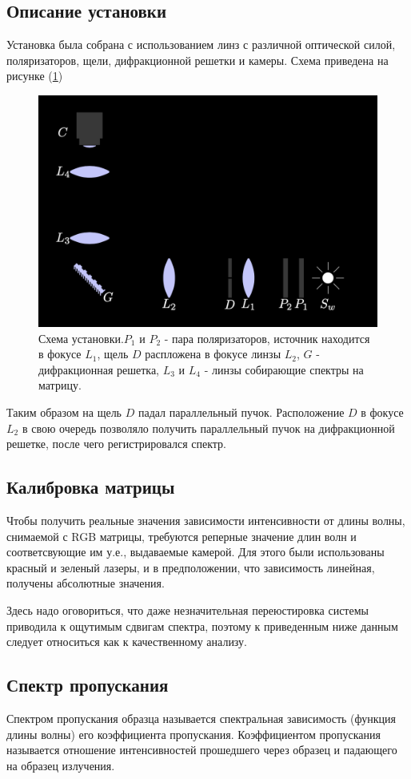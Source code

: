 \documentclass[a4paper, 12pt]{article}
\begin{document}
\subsection{Описание установки}

Установка была собрана с использованием линз с различной оптической силой, поляризаторов, щели, дифракционной решетки и камеры. Схема приведена на рисунке (\ref{fig:scheme})

\begin{figure}[H]
	\centering
	\includegraphics[width=0.7\linewidth]{Scheme.png}
	\caption{Схема установки.$P_1$ и $P_2$ - пара поляризаторов, источник находится в фокусе $L_1$, щель $D$ распложена в фокусе линзы $L_2$, $G$ - дифракционная решетка, $L_3$ и $L_4$ - линзы собирающие спектры на матрицу.}
	\label{fig:scheme}
\end{figure}

Таким образом на щель $D$ падал параллельный пучок. Расположение $D$ в фокусе $L_2$ в свою очередь позволяло получить параллельный пучок на дифракционной решетке, после чего регистрировался спектр.

\subsection{Калибровка матрицы}

Чтобы получить реальные значения зависимости интенсивности от длины волны, снимаемой с RGB матрицы, требуются реперные значение длин волн и соответсвующие им у.е., выдаваемые камерой. Для этого были использованы красный и зеленый лазеры, и в предположении, что зависимость линейная, получены абсолютные значения.

Здесь надо оговориться, что даже незначительная переюстировка системы приводила к ощутимым сдвигам спектра, поэтому к приведенным ниже данным следует относиться как к качественному анализу.


\subsection{Спектр пропускания}
Спектром пропускания образца называется спектральная зависимость (функция длины волны) его коэффициента пропускания. Коэффициентом пропускания называется отношение интенсивностей прошедшего через образец и падающего на образец излучения.
\end{document}
